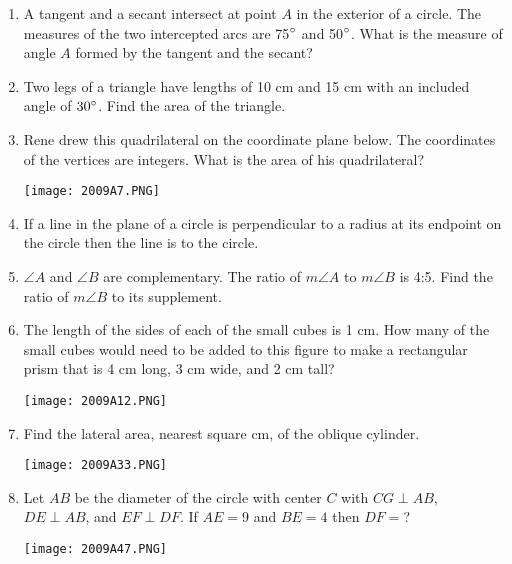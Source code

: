 \documentclass[../uilmath.tex]{subfiles}
\begin{document}
\begin{enumerate}[label=\bfseries\arabic*.]
    \item %
    A tangent and a secant intersect at point $A$ in the exterior of a circle. The measures of the two intercepted arcs are 
    75$\degree$ and 50$\degree$. What is the measure of angle $A$ formed by the tangent and the secant?

    \item %
    Two legs of a triangle have lengths of 10 cm and 15 cm with an included angle of $30\degree$. Find the area of the triangle.

    \item %
    Rene drew this quadrilateral on the coordinate plane below. The coordinates of the vertices are integers. What is the area of his quadrilateral?
    \begin{center}
        \texttt{[image: 2009A7.PNG]}
    \end{center}

    \item %
    If a line in the plane of a circle is perpendicular to a radius at its endpoint on the circle then the line is \blank to the circle.

    \item %
    $\angle A$ and $\angle B$ are complementary. The ratio of $m\angle A$ to $m\angle B$ is 4:5. Find the ratio of $m\angle B$ to its supplement.

    \item %
    The length of the sides of each of the small cubes is 1 cm. How many of the small cubes would need to be added to this figure 
    to make a rectangular prism that is 4 cm long, 3 cm wide, and 2 cm tall?
    \begin{center}
        \texttt{[image: 2009A12.PNG]}
    \end{center}

    \item %
    Find the lateral area, nearest square cm, of the oblique cylinder.
    \begin{center}
        \texttt{[image: 2009A33.PNG]}
    \end{center}

    \item %
    Let $AB$ be the diameter of the circle with center $C$ with $CG\perp AB$, $DE\perp AB$, and $EF\perp DF$. If $AE=9$ and $BE=4$ then $DF=$?
    \begin{center}
        \texttt{[image: 2009A47.PNG]}
    \end{center}


\end{enumerate}
\end{document}
